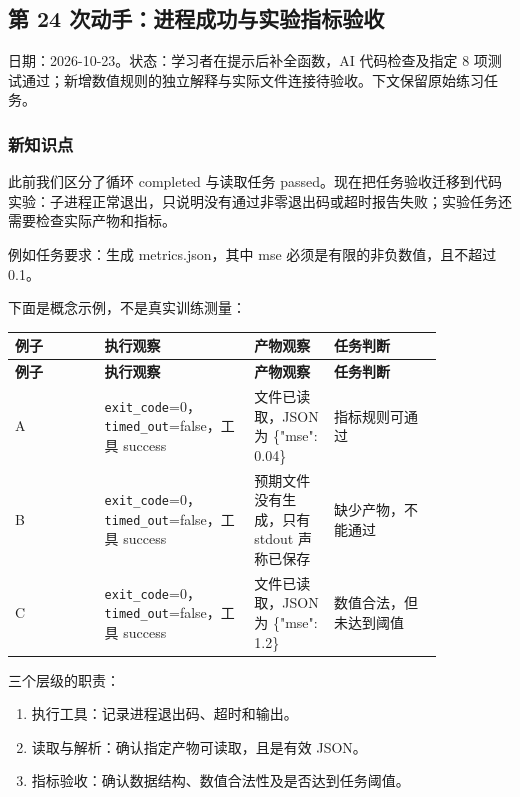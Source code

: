 \subsection{第 24 次动手：进程成功与实验指标验收}

日期：2026-10-23。状态：学习者在提示后补全函数，AI 代码检查及指定 8 项测试通过；新增数值规则的独立解释与实际文件连接待验收。下文保留原始练习任务。

\subsubsection{新知识点}

此前我们区分了循环 completed 与读取任务 passed。现在把任务验收迁移到代码实验：子进程正常退出，只说明没有通过非零退出码或超时报告失败；实验任务还需要检查实际产物和指标。

例如任务要求：生成 metrics.json，其中 mse 必须是有限的非负数值，且不超过 0.1。

下面是概念示例，不是真实训练测量：

{\small\setlength{\tabcolsep}{4pt}
\renewcommand{\arraystretch}{1.25}
\begin{longtable}{>{\raggedright\arraybackslash}p{0.18\linewidth}>{\raggedright\arraybackslash}p{0.29\linewidth}>{\raggedright\arraybackslash}p{0.16\linewidth}>{\raggedright\arraybackslash}p{0.22\linewidth}}
\toprule
\textbf{例子} & \textbf{执行观察} & \textbf{产物观察} & \textbf{任务判断} \\
\midrule\endfirsthead
\toprule
\textbf{例子} & \textbf{执行观察} & \textbf{产物观察} & \textbf{任务判断} \\
\midrule\endhead
\bottomrule\endfoot
A & \nolinkurl{exit_code}=0，\nolinkurl{timed_out}=false，工具 success & 文件已读取，JSON 为 \{"mse": 0.04\} & 指标规则可通过 \\
B & \nolinkurl{exit_code}=0，\nolinkurl{timed_out}=false，工具 success & 预期文件没有生成，只有 stdout 声称已保存 & 缺少产物，不能通过 \\
C & \nolinkurl{exit_code}=0，\nolinkurl{timed_out}=false，工具 success & 文件已读取，JSON 为 \{"mse": 1.2\} & 数值合法，但未达到阈值 \\
\end{longtable}}

三个层级的职责：

\begin{enumerate}
\item 执行工具：记录进程退出码、超时和输出。
\item 读取与解析：确认指定产物可读取，且是有效 JSON。
\item 指标验收：确认数据结构、数值合法性及是否达到任务阈值。
\end{enumerate}

